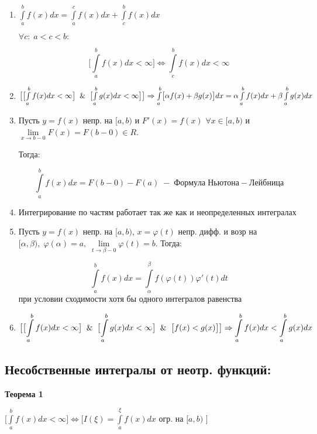 \documentclass[a4paper,12pt]{article} %
\begin{document}
\begin{enumerate}
    \item $\int\limits_a^{b} f(x) dx = \int\limits_a^{c} f(x) dx + \int\limits_c^{b} f(x) dx$

$\forall c:\; a<c<b:$

$$\bigl[\int\limits_a^{b} f(x) dx<\infty \bigr] \Leftrightarrow \int\limits_c^{b} f(x) dx < \infty$$

    \item $\bigl[ \bigl[ \int\limits_a^{b} f(x) dx<\infty\bigr] \And \bigl[ \int\limits_a^{b} g(x) dx<\infty \bigr]\bigr] \Rightarrow \int\limits_a^{b} \bigl[\alpha f(x) + \beta g(x)\bigr] dx = \alpha \int\limits_a^{b} f(x) dx + \beta \int\limits_a^{b} g(x) dx$
    
    \item Пусть $y=f(x)$ непр. на $[a, b)$ и $F'(x) = f(x)$ $\forall x\in[a, b)$ и $\lim\limits_{x\rightarrow b-0} F(x) = F(b-0) \in R$.
    
    Тогда:
    
    $$\int\limits_a^{b} f(x) dx = F(b-0) - F(a)\; -\; Формула\; Ньютона-Лейбница$$ 
    
    
    \item  Интегрирование по частям работает так же как и неопределенных интегралах
    
    \item Пусть $y=f(x)$ непр. на $[a, b)$, $x=\varphi(t)$ непр. дифф. и возр на $[\alpha, \beta),\; \varphi(\alpha)=a,\; 
    \lim\limits_{t\rightarrow \beta - 0}\varphi(t) = b$. Тогда:
    
    $$\int\limits_a^{b} f(x) dx = \int\limits_\alpha^{\beta} f(\varphi(t))\varphi ' (t) dt$$
    при условии сходимости хотя бы одного интегралов равенства
    
    \item $$\bigl[ \bigl[ \int\limits_a^{b} f(x) dx<\infty\bigr] \And \bigl[ \int\limits_a^{b} g(x) dx<\infty \bigr] \And \bigl[ f(x) < g(x) \bigr] \bigr] \Rightarrow \int\limits_a^{b} f(x) dx < \int\limits_a^{b} g(x) dx $$
    
\end{enumerate}

\subsection*{Несобственные интегралы от неотр. функций:}

\textbf{Теорема 1}

$\bigl[ \int\limits_a^{b} f(x) dx <\infty \bigr] \Leftrightarrow \bigl[ I(\xi) = \int\limits_a^{\xi} f(x) dx$ \;огр.\; на\; $[a, b)$ $\bigr]$
\end{document}

